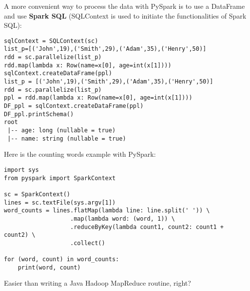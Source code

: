 \documentclass{beamer}[10pt, usepdftitle=false handout]
\begin{document}
\begin{frame}[fragile]

A more convenient way to process the data with PySpark is to use a DataFrame and use \textbf{Spark SQL} (SQLContext is used to initiate the functionalities of Spark SQL): 
\vspace*{0.6em}

\begin{verbatim}
sqlContext = SQLContext(sc)
list_p=[('John',19),('Smith',29),('Adam',35),('Henry',50)]
rdd = sc.parallelize(list_p) 
rdd.map(lambda x: Row(name=x[0], age=int(x[1])))  
sqlContext.createDataFrame(ppl)
list_p = [('John',19),('Smith',29),('Adam',35),('Henry',50)]
rdd = sc.parallelize(list_p)
ppl = rdd.map(lambda x: Row(name=x[0], age=int(x[1])))
DF_ppl = sqlContext.createDataFrame(ppl)  
DF_ppl.printSchema()
root
 |-- age: long (nullable = true)
 |-- name: string (nullable = true)
\end{verbatim}



\end{frame}
\begin{frame}[fragile]
Here is the counting words example with PySpark:
\begingroup
\fontsize{6pt}{10pt}\selectfont
\begin{verbatim}
import sys
from pyspark import SparkContext

sc = SparkContext()
lines = sc.textFile(sys.argv[1])
word_counts = lines.flatMap(lambda line: line.split(' ')) \
                   .map(lambda word: (word, 1)) \
                   .reduceByKey(lambda count1, count2: count1 + count2) \
                   .collect()

for (word, count) in word_counts:
    print(word, count)    
\end{verbatim}
\endgroup
Easier than writing a Java Hadoop MapReduce routine, right?

\end{frame}
\end{document}

